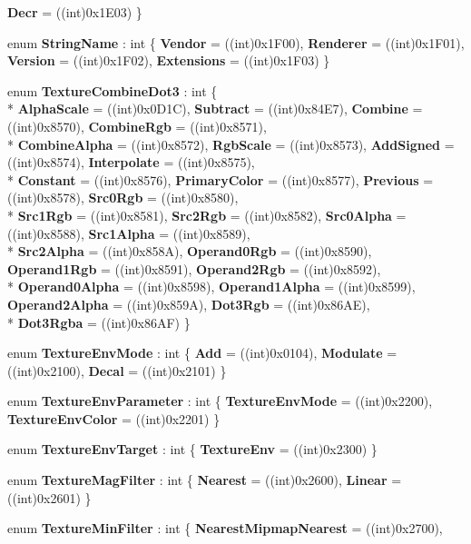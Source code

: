 \begin{DoxyCompactItemize}
{\bfseries Decr} = ((int)0x1\-E03)
 \}
\item 
enum {\bfseries String\-Name} \-: int \{ {\bfseries Vendor} = ((int)0x1\-F00), 
{\bfseries Renderer} = ((int)0x1\-F01), 
{\bfseries Version} = ((int)0x1\-F02), 
{\bfseries Extensions} = ((int)0x1\-F03)
 \}
\item 
enum {\bfseries Texture\-Combine\-Dot3} \-: int \{ \\*
{\bfseries Alpha\-Scale} = ((int)0x0\-D1\-C), 
{\bfseries Subtract} = ((int)0x84\-E7), 
{\bfseries Combine} = ((int)0x8570), 
{\bfseries Combine\-Rgb} = ((int)0x8571), 
\\*
{\bfseries Combine\-Alpha} = ((int)0x8572), 
{\bfseries Rgb\-Scale} = ((int)0x8573), 
{\bfseries Add\-Signed} = ((int)0x8574), 
{\bfseries Interpolate} = ((int)0x8575), 
\\*
{\bfseries Constant} = ((int)0x8576), 
{\bfseries Primary\-Color} = ((int)0x8577), 
{\bfseries Previous} = ((int)0x8578), 
{\bfseries Src0\-Rgb} = ((int)0x8580), 
\\*
{\bfseries Src1\-Rgb} = ((int)0x8581), 
{\bfseries Src2\-Rgb} = ((int)0x8582), 
{\bfseries Src0\-Alpha} = ((int)0x8588), 
{\bfseries Src1\-Alpha} = ((int)0x8589), 
\\*
{\bfseries Src2\-Alpha} = ((int)0x858\-A), 
{\bfseries Operand0\-Rgb} = ((int)0x8590), 
{\bfseries Operand1\-Rgb} = ((int)0x8591), 
{\bfseries Operand2\-Rgb} = ((int)0x8592), 
\\*
{\bfseries Operand0\-Alpha} = ((int)0x8598), 
{\bfseries Operand1\-Alpha} = ((int)0x8599), 
{\bfseries Operand2\-Alpha} = ((int)0x859\-A), 
{\bfseries Dot3\-Rgb} = ((int)0x86\-A\-E), 
\\*
{\bfseries Dot3\-Rgba} = ((int)0x86\-A\-F)
 \}
\item 
enum {\bfseries Texture\-Env\-Mode} \-: int \{ {\bfseries Add} = ((int)0x0104), 
{\bfseries Modulate} = ((int)0x2100), 
{\bfseries Decal} = ((int)0x2101)
 \}
\item 
enum {\bfseries Texture\-Env\-Parameter} \-: int \{ {\bfseries Texture\-Env\-Mode} = ((int)0x2200), 
{\bfseries Texture\-Env\-Color} = ((int)0x2201)
 \}
\item 
enum {\bfseries Texture\-Env\-Target} \-: int \{ {\bfseries Texture\-Env} = ((int)0x2300)
 \}
\item 
enum {\bfseries Texture\-Mag\-Filter} \-: int \{ {\bfseries Nearest} = ((int)0x2600), 
{\bfseries Linear} = ((int)0x2601)
 \}
\item 
enum {\bfseries Texture\-Min\-Filter} \-: int \{ {\bfseries Nearest\-Mipmap\-Nearest} = ((int)0x2700), 

\end{DoxyCompactItemize}
